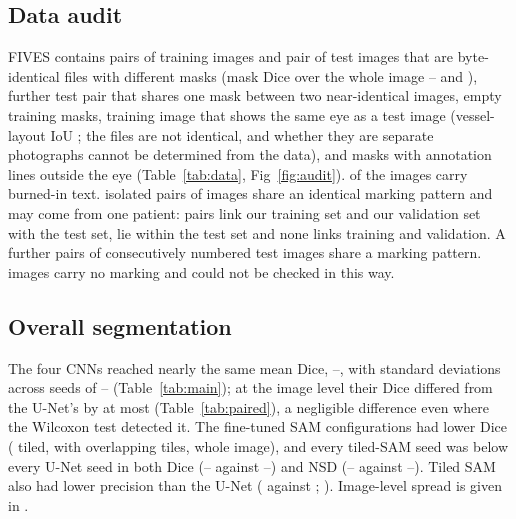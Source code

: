 \subsection*{Data audit}
FIVES contains \NDupPairsTrain{} pairs of training images and \NDupPairsTest{} pair of test images that
are byte-identical files with different masks (mask Dice over the whole image \DupTrainMaskDiceMin--\DupTrainMaskDiceMax{}
and \DupTestMaskDice), \NSharedMaskTestPairs{} further test pair that shares one mask between two near-identical images,
\NEmptyMasks{} empty training masks, \NSameEyePairs{} training image that shows the same eye as a test image (vessel-layout
IoU \SameEyeIoU; the files are not identical, and whether they are separate photographs cannot be determined from the
data), and \NBorderMasks{} masks with annotation lines outside the eye (Table~\ref{tab:data}, Fig~\ref{fig:audit}).
\NMarkings{} of the \NImages{} images carry burned-in text. \NIsoPairs{} isolated pairs of images share an identical marking
pattern and may come from one patient: \NIsoTrainTest{} pairs link our training set and \NIsoValTest{} our validation set
with the test set, \NIsoTestTest{} lie within the test set and none links training and validation. A further
\NAdjTestTest{} pairs of consecutively numbered test images share a marking pattern. \NNoMarking{} images carry no marking
and could not be checked in this way.

\subsection*{Overall segmentation}
The four CNNs reached nearly the same mean Dice, \CNNDiceMin--\CNNDiceMax{}, with standard deviations across seeds of
\CNNDiceSdSeedMin--\CNNDiceSdSeedMax{} (Table~\ref{tab:main}); at the image level their Dice differed from the U-Net's by
at most \MSDiceDiff{} (Table~\ref{tab:paired}), a negligible difference even where the Wilcoxon test detected it. The
fine-tuned SAM configurations had lower Dice (\SAMTiledDiceMean{} tiled, \SAMOverlapDiceMean{} with overlapping tiles,
\SAMWholeDiceMean{} whole image), and every tiled-SAM seed was below every U-Net seed in both Dice
(\SAMTiledDiceSeedMin--\SAMTiledDiceSeedMax{} against \UNetDiceSeedMin--\UNetDiceSeedMax) and NSD
(\SAMTiledNSDSeedMin--\SAMTiledNSDSeedMax{} against \UNetNSDSeedMin--\UNetNSDSeedMax). Tiled SAM also had lower precision
than the U-Net (\SAMTiledPrecMean{} against \UNetPrecMean; ). Image-level spread is given in
.

